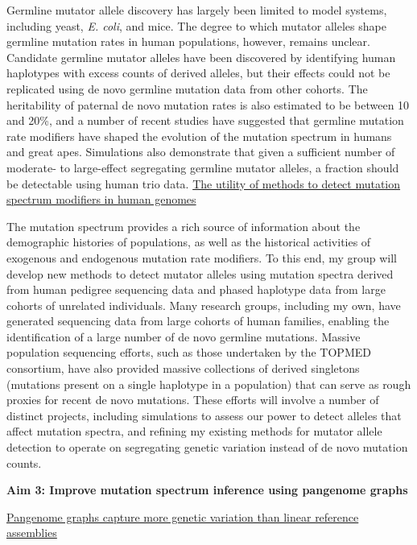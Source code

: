\documentclass[11pt,a4paper,sans]{moderncv}
\begin{document}
Germline mutator allele discovery has largely been limited to model systems, 
including yeast, \emph{E. coli}, and mice. The degree to which mutator alleles shape 
germline mutation rates in human populations, however, remains unclear. Candidate 
germline mutator alleles have been discovered by identifying human 
haplotypes with excess counts of derived alleles, but their effects could not be 
replicated using de novo germline mutation data from other cohorts. The heritability
of paternal de novo mutation rates is also estimated to be between 10 and 20\%, 
and a number of recent studies have suggested that germline mutation rate 
modifiers have shaped the evolution of the mutation spectrum in humans and 
great apes. Simulations also demonstrate that given a sufficient number of 
moderate- to large-effect segregating germline mutator alleles, a fraction 
should be detectable using human trio data. 
\break \break
\underline{The utility of methods to detect mutation spectrum modifiers in human genomes}

The mutation spectrum provides a rich source of information about the demographic 
histories of populations, as well as the historical activities of exogenous and 
endogenous mutation rate modifiers. To this end, my group will develop new methods
to detect mutator alleles using mutation spectra derived from human pedigree 
sequencing data and phased haplotype data from large cohorts of unrelated 
individuals. Many research groups, including my own, have generated sequencing 
data from large cohorts of human families, enabling the identification of a 
large number of de novo germline mutations. Massive population sequencing efforts,
such as those undertaken by the TOPMED consortium, have also provided massive 
collections of derived singletons (mutations present on a single haplotype in 
a population) that can serve as rough proxies for recent de novo mutations. 
These efforts will involve a number of distinct projects, including simulations
to assess our power to detect alleles that affect mutation spectra, and 
refining my existing methods for mutator allele detection to operate on 
segregating genetic variation instead of de novo mutation counts.
\break \break

\textbf{Aim 3: Improve mutation spectrum inference using pangenome graphs}

\underline{Pangenome graphs capture more genetic variation than linear reference assemblies}
\end{document}
